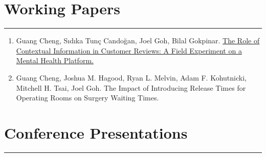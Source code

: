 \documentclass[12pt, a4paper]{article}
\begin{document}
{\section*{Working Papers}
\vspace*{4pt}
\hrule

\begin{enumerate}[leftmargin=30pt, resume]
	
	\item Guang Cheng, S\i{}d\i{}ka Tun\c{c} Cando\u{g}an, Joel Goh, Bilal Gokpinar.
	\href{https://ssrn.com/abstract=4956298}{The Role of Contextual Information in Customer Reviews: A Field Experiment on a Mental Health Platform.}

	\item Guang Cheng, Joshua M. Hagood, Ryan L. Melvin, Adam F. Kohutnicki, Mitchell H. Tsai, Joel Goh. The Impact of Introducing Release Times for Operating Rooms on Surgery Waiting Times.

\end{enumerate}






	





\section*{Conference Presentations}
\vspace*{4pt}
\hrule

\begin{itemize}[leftmargin=14pt]


\end{itemize}}
\end{document}
